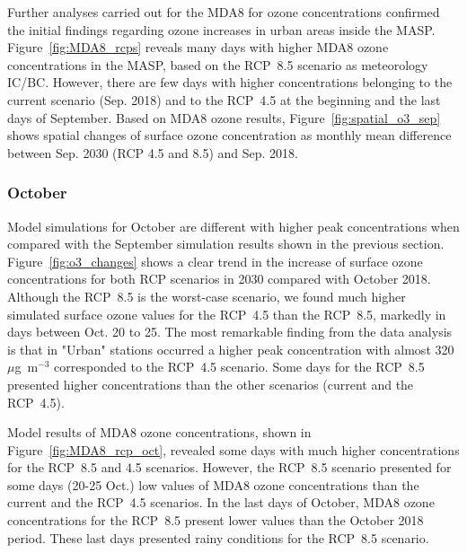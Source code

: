 Further analyses carried out for the MDA8 for ozone concentrations confirmed the initial findings regarding ozone increases in urban areas inside the MASP.
Figure~\ref{fig:MDA8_rcps} reveals many days with higher MDA8 ozone concentrations in the MASP, based on the RCP~8.5 scenario as meteorology IC/BC.
However, there are few days with higher concentrations belonging to the current scenario (Sep. 2018) and to the RCP~4.5 at the beginning and the last days of September.
Based on MDA8 ozone results, Figure~\ref{fig:spatial_o3_sep} shows spatial changes of surface ozone concentration as monthly mean difference between Sep. 2030 (RCP 4.5 and 8.5) and Sep. 2018.

\subsubsection{October}
Model simulations for October are different with higher peak concentrations when compared with the September simulation results shown in the previous section.
Figure~\ref{fig:o3_changes} shows a clear trend in the increase of surface ozone concentrations for both RCP scenarios in 2030 compared with October 2018.
Although the RCP~8.5 is the worst-case scenario, we found much higher simulated surface ozone values for the RCP~4.5 than the RCP~8.5, markedly in days between Oct. 20 to 25.
The most remarkable finding from the data analysis is that in "Urban" stations occurred a higher peak concentration with almost 320 $\mu$g~m$^{-3}$ corresponded to the RCP~4.5 scenario.
Some days for the RCP~8.5 presented higher concentrations than the other scenarios (current and the RCP~4.5).

Model results of MDA8 ozone concentrations, shown in Figure~\ref{fig:MDA8_rcp_oct}, revealed some days with much higher concentrations for the RCP~8.5 and 4.5 scenarios.
However, the RCP~8.5 scenario presented for some days (20-25 Oct.) low values of MDA8 ozone concentrations than the current and the RCP~4.5 scenarios.
In the last days of October, MDA8 ozone concentrations for the RCP~8.5 present lower values than the October 2018 period.
These last days presented rainy conditions for the RCP~8.5 scenario. 

